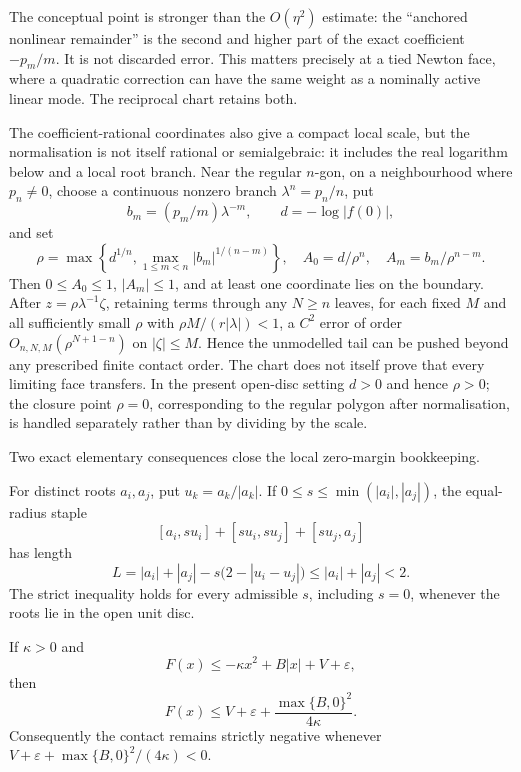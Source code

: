The conceptual point is stronger than the $O(\eta^2)$ estimate: the
``anchored nonlinear remainder'' is the second and higher part of the exact
coefficient $-p_m/m$.  It is not discarded error.  This matters precisely at
a tied Newton face, where a quadratic correction can have the same weight as
a nominally active linear mode.  The reciprocal chart retains both.

The coefficient-rational coordinates also give a compact local scale, but the
normalisation is not itself rational or semialgebraic: it includes the real
logarithm below and a local root branch.  Near the regular $n$-gon, on a
neighbourhood where $p_n\ne0$, choose a continuous nonzero branch
$\lambda^n=p_n/n$, put
\[
 b_m=(p_m/m)\lambda^{-m},\qquad
 d=-\log|f(0)|,
\]
and set
\[
 \rho=\max\left\{d^{1/n},
   \max_{1\le m<n}|b_m|^{1/(n-m)}\right\},
 \quad A_0=d/\rho^n,
 \quad A_m=b_m/\rho^{n-m}.
\]
Then $0\le A_0\le1$, $|A_m|\le1$, and at least one coordinate lies on the
boundary.  After $z=\rho\lambda^{-1}\zeta$, retaining terms through any
$N\ge n$ leaves, for each fixed $M$ and all sufficiently small $\rho$ with
$\rho M/(r|\lambda|)<1$, a $C^2$ error of order
$O_{n,N,M}(\rho^{N+1-n})$ on $|\zeta|\le M$.  Hence the unmodelled tail can
be pushed beyond any prescribed finite contact order.  The chart does not
itself prove that every limiting face transfers.  In the present open-disc
setting $d>0$ and hence $\rho>0$; the closure point $\rho=0$, corresponding
to the regular polygon after normalisation, is handled separately rather than
by dividing by the scale.

Two exact elementary consequences close the local zero-margin bookkeeping.

\begin{proposition}
\label{res:staple-contact}
For distinct roots $a_i,a_j$, put $u_k=a_k/|a_k|$.  If
$0\le s\le\min(|a_i|,|a_j|)$, the equal-radius staple
\[
 [a_i,su_i]+[su_i,su_j]+[su_j,a_j]
\]
has length
\[
 L=|a_i|+|a_j|-s\bigl(2-|u_i-u_j|\bigr)
 \le |a_i|+|a_j|<2.                                    \tag{R8}
\]
The strict inequality holds for every admissible $s$, including $s=0$,
whenever the roots lie in the open unit disc.

If $\kappa>0$ and
\[
 F(x)\le-\kappa x^2+B|x|+V+\varepsilon,
\]
then
\[
 F(x)\le V+\varepsilon+
   \frac{\max\{B,0\}^2}{4\kappa}.                    \tag{R9}
\]
Consequently the contact remains strictly negative whenever
$V+\varepsilon+\max\{B,0\}^2/(4\kappa)<0$.
\end{proposition}

